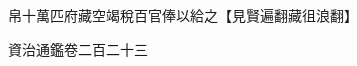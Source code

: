 　　帛十萬匹府藏空竭稅百官俸以給之【見賢遍翻藏徂浪翻】

　　資治通鑑卷二百二十三  
    


 


 



 

 
  







 


　　
　　
　
　
　


　　

　















	
	









































 
  



















 





 












  
  
  

 





